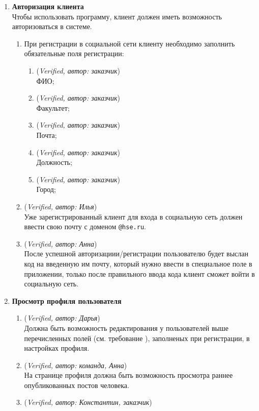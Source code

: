 \begin{enumerate}
	\item \textbf{Авторизация клиента\\}
	Чтобы использовать программу, клиент должен иметь возможность авторизоваться в системе.
	\begin{enumerate} \label{req: auth}
		\item При регистрации в социальной сети клиенту необходимо заполнить обязательные поля регистрации: \label{FR-1.2}
		\begin{enumerate}
			\item (\textit{Verified, автор: заказчик}) \\ФИО;
			\item (\textit{Verified, автор: заказчик}) \\Факультет;
			\item (\textit{Verified, автор: заказчик})\\Почта;
			\item (\textit{Verified, автор: заказчик})\\Должность; 
			\item (\textit{Verified, автор: заказчик})\\Город; 
		\end{enumerate}
		\item (\textit{Verified, автор: Илья})\\Уже зарегистрированный клиент для входа в социальную сеть должен ввести свою почту с доменом \verb+@hse.ru+.
		\item (\textit{Verified, автор: Анна})\\
		После успешной авторизациии/регистрации пользователю будет выслан код на введенную им почту, который нужно ввести в специальное поле в приложении, только после правильного ввода кода клиент сможет войти в социальную сеть.
	\end{enumerate}
	\item \textbf{Просмотр профиля пользователя}
	\begin{enumerate}
		\item (\textit{Verified, автор: Дарья})\\Должна быть возможность редактирования у пользователей выше перечисленных полей (см. требование ), заполненых при регистрации, в настройках профиля. 
		\item (\textit{Verified, автор: команда, Анна})\\
		На странице профиля должна быть возможность просмотра раннее опубликованных постов человека. 
		\item (\textit{Verified, автор: Константин, заказчик})\\ 

\end{enumerate}
\end{enumerate}
